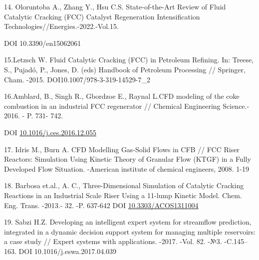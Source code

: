 \begin{references}
14. Oloruntoba A., Zhang Y., Hsu C.S. State-of-the-Art Review of Fluid
Catalytic Cracking (FCC) Catalyst Regeneration Intensification
Technologies//Energies.-2022.-Vol.15.

DOI 10.3390/en15062061

15.Letzsch W. Fluid Catalytic Cracking (FCC) in Petroleum Refining. In:
Treese, S., Pujadó, P., Jones, D. (eds) Handbook of Petroleum Processing
// Springer, Cham. -2015. DOI10.1007/978-3-319-14529-7\_2

16.Amblard, B., Singh R., Gbordzoe E., Raynal L.CFD modeling of the coke
combustion in an industrial FCC regenerator // Chemical Engineering
Science.- 2016. - P. 731- 742.

DOI
\href{http://dx.doi.org/10.1016/j.ces.2016.12.055}{10.1016/j.ces.2016.12.055}

17. Idris M., Burn A. CFD Modelling Gas-Solid Flows in CFB // FCC Riser
Reactors: Simulation Using Kinetic Theory of Granular Flow (KTGF) in a
Fully Developed Flow Situation. -American institute of chemical
engineers, 2008. 1-19

18. Barbosa et.al., A. C., Three-Dimensional Simulation of Catalytic
Cracking Reactions in an Industrial Scale Riser Using a 11-lump Kinetic
Model. Chem. Eng. Trans. -2013.- 32. -P. 637-642 DOI
\href{http://dx.doi.org/10.3303/ACOS1311004}{10.3303/ACOS1311004}

19. Sabzi H.Z. Developing an intelligent expert system for streamflow
prediction, integrated in a dynamic decision support system for managing
multiple reservoirs: a case study // Expert systems with applications.
-2017. -Vol. 82. -№3. -C.145--163. DOI 10.1016/j.eswa.2017.04.039
\end{references}

